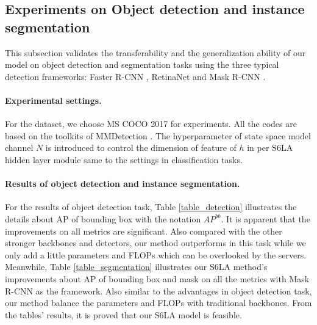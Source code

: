 \subsection{Experiments on Object detection and instance segmentation}

This subsection validates the transferability and the generalization ability of our model on object detection and segmentation tasks using the three typical detection frameworks: Faster R-CNN \citep{ren2016faster}, RetinaNet \citep{lin2018focallossdenseobject} and Mask R-CNN \citep{he2018maskrcnn}.

\paragraph{Experimental settings.} For the dataset, we choose MS COCO 2017 \citep{lin2014microsoft} for experiments. All the codes are based on the toolkits of MMDetection \citep{chen2019mmdetectionopenmmlabdetection}. The hyperparameter of state space model channel $N$ is introduced to control the dimension of feature of $h$ in per S6LA hidden layer module same to the settings in classification tasks.

\paragraph{Results of object detection and instance segmentation.} For the results of object detection task, Table \ref{table_detection} illustrates the details about AP of bounding box with the notation $AP^{bb}$. It is apparent that the improvements on all metrics are significant. Also compared with the other stronger backbones and detectors, our method outperforms in this task while we only add a little parameters and FLOPs which can be overlooked by the servers.  Meanwhile, Table \ref{table_segmentation} illustrates our S6LA method's improvements about AP of bounding box and mask on all the metrics with Mask R-CNN as the framework. Also similar to the advantages in object detection task, our method balance the parameters and FLOPs with traditional backbones. From the tables' results, it is proved that our S6LA model is feasible.

